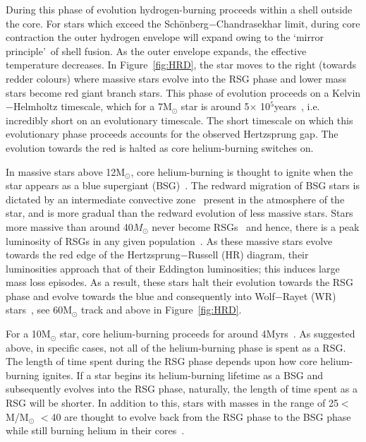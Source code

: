 During this phase of evolution hydrogen-burning proceeds within a shell outside the core.
For stars which exceed the Sch\"onberg$-$Chandrasekhar limit, during core contraction the outer hydrogen envelope will expand owing to the \textquoteleft mirror principle\textquoteright ~of shell fusion.\footnotemark
{}
As the outer envelope expands, the effective temperature decreases.
In Figure~\ref{fig:HRD}, the star moves to the right (towards redder colours) where massive stars evolve into the RSG phase and lower mass stars become red giant branch stars.
This phase of evolution proceeds on a Kelvin$-$Helmholtz timescale, which for a 7M$_{\odot}$ star is around 5$\times$ 10$^{5}$years~\citep{b:KippenhahnWeigert}, i.e. incredibly short on an evolutionary timescale.
The short timescale on which this evolutionary phase proceeds accounts for the observed Hertzsprung gap.
The evolution towards the red is halted as core helium-burning switches on.

In massive stars above 12M$_{\odot}$, core helium-burning is thought to ignite when the star appears as a blue supergiant (BSG)~\citep{Meynet11,2012A&A...537A.146E,Langer12,Saio13}.
The redward migration of BSG stars is dictated by an intermediate convective zone~\citep{Meynet11} present in the atmosphere of the star, and is more gradual than the redward evolution of less massive stars.
Stars more massive than around 40$M_{\odot}$ never become RSGs~\citep{Massey03,Meynet11,2012A&A...537A.146E} and hence, there is a peak luminosity of RSGs in any given population~\citep{1979ApJ...232..409H}.
As these massive stars evolve towards the red edge of the Hertzsprung$-$Russell (HR) diagram, their luminosities approach that of their Eddington luminosities; this induces large mass loss episodes.
As a result, these stars halt their evolution towards the RSG phase and evolve towards the blue and consequently into Wolf$-$Rayet (WR) stars~\citep{Crowther07, Vink09}, see 60M$_{\odot}$ track and above in Figure~\ref{fig:HRD}.

For a 10M$_{\odot}$ star, core helium-burning proceeds for around 4Myrs~\citep{b:SalarisCassisi05}.
As suggested above, in specific cases, not all of the helium-burning phase is spent as a RSG.
The length of time spent during the RSG phase depends upon how core helium-burning ignites.
If a star begins its helium-burning lifetime as a BSG and subsequently evolves into the RSG phase, naturally, the length of time spent as a RSG will be shorter.
In addition to this, stars with masses in the range of 25$<$M/M$_{\odot}$ $<$40 are thought to evolve back from the RSG phase to the BSG phase while still burning helium in their cores~\citep{2012A&A...537A.146E}.

